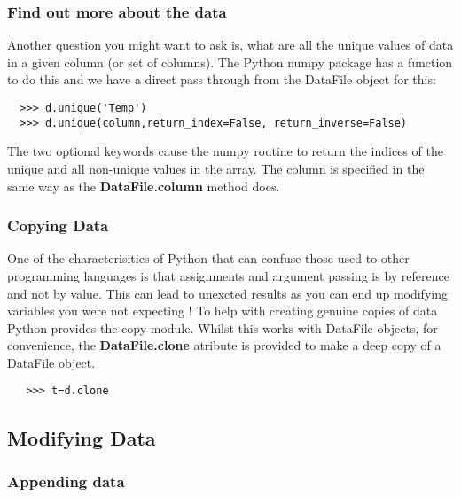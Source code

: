 \documentclass[a4paper,11pt]{scrartcl}
\begin{document}
\subsubsection{Find out more about the data}

Another question you might want to ask is, what are all the unique
values of data in a given column (or set of columns). The Python numpy
package has a function to do this and we have a direct pass through
from the DataFile object for this:

\begin{verbatim}
  >>> d.unique('Temp')
  >>> d.unique(column,return_index=False, return_inverse=False)
\end{verbatim}

The two optional keywords cause the numpy routine to return the
indices of the unique and all non-unique values in the array. The
column is specified in the same way as the \textbf{DataFile.column}
method does.

\subsubsection{Copying Data}

One of the characterisitics of Python that can confuse those used to other
programming languages is that assignments and argument passing is by reference
and not by value. This can lead to unexcted results as you can end up modifying variables you were not expecting ! To help with creating genuine copies of data Python provides the copy module. Whilst this works with DataFile objects, for convenience, the \textbf{DataFile.clone} atribute is provided to make a deep copy of a DataFile object.


\begin{verbatim}
   >>> t=d.clone
\end{verbatim}


\subsection{Modifying Data}

\subsubsection{Appending data}
\end{document}

